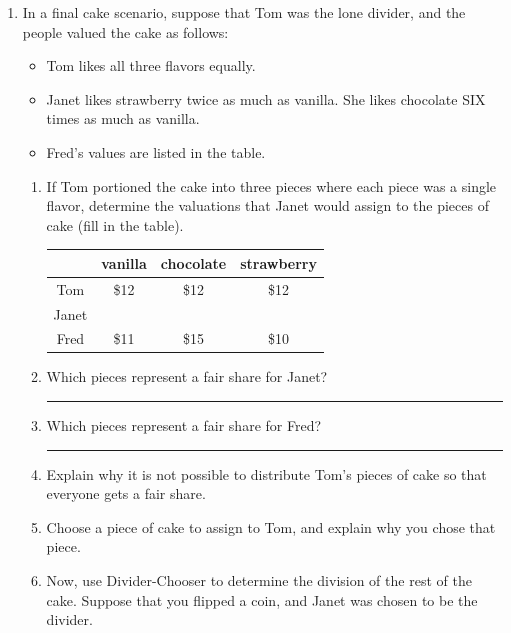 \documentclass[12pt]{article}
\newcommand{\ans}[1][1in]{\rule{#1}{.5pt}}
\begin{document}
\begin{enumerate}
\begin{enumerate}
\vfill

\end{enumerate}


\newpage

\item In a final cake scenario, suppose that Tom was the lone divider, and the people valued the cake as follows:

\begin{itemize}
\item Tom likes all three flavors equally.
\item Janet likes strawberry twice as much as vanilla. She likes chocolate SIX times as much as vanilla.
\item Fred's values are listed in the table.
\end{itemize}

\begin{enumerate}

\item If Tom portioned the cake into three pieces where each piece was a single flavor, determine the valuations that Janet would assign to the pieces of cake (fill in the table).

\bigskip

{  %
\renewcommand{\arraystretch}{1.4} 
\begin{tabular}{| c | c | c | c |}
\hline
& vanilla& chocolate  & strawberry \\ \hline \hline
Tom & \$12 & \$12 & \$12 \\ \hline
Janet&  &  &  \\ \hline
Fred& \$11& \$15 & \$10  \\
\hline
\end{tabular}
}
\bigskip

\item Which pieces represent a fair share  for Janet? \ans[2in]
\item Which pieces represent a fair share  for Fred? \ans[2in]
\item Explain why it is not possible to distribute Tom's pieces of cake so that everyone gets a fair share.

\vfill

\item Choose a piece of cake to assign to Tom, and explain why you chose that piece.

\vfill

\item Now, use Divider-Chooser to determine the division of the rest of the cake. Suppose that you flipped a coin, and Janet was chosen to be the divider. 


\end{enumerate}
\end{enumerate}
\end{document}
